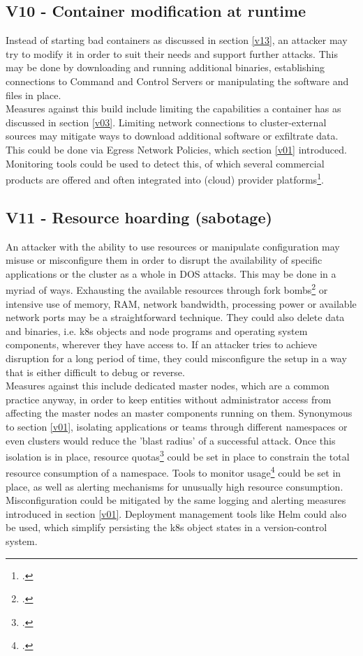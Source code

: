 \subsection{V10 - Container modification at runtime} \label{v10}
Instead of starting bad containers as discussed in section \ref{v13}, an attacker may try to modify it in order to suit their needs and support further attacks.
This may be done by downloading and running additional binaries, establishing connections to Command and Control Servers or manipulating the software and files in place. \\
Measures against this build include limiting the capabilities a container has as discussed in section \ref{v03}. Limiting network connections to cluster-external sources may mitigate ways to download additional software or exfiltrate data. This could be done via Egress Network Policies, which section \ref{v01} introduced.
Monitoring tools could be used to detect this, of which several commercial products are offered and often integrated into (cloud) provider platforms\footcite[][, slide 40 to 41]{runtimeProt}.

\subsection{V11 - Resource hoarding (sabotage)} \label{v11}
An attacker with the ability to use resources or manipulate configuration may misuse or misconfigure them in order to disrupt the availability of specific applications or the cluster as a whole in DOS attacks.
This may be done in a myriad of ways. Exhausting the available resources through fork bombs\footcite[][, chapter 'Fork Bombs and Resource-Based Attacks']{k8sBook} or intensive use of memory, RAM, network bandwidth, processing power or available network ports may be a straightforward technique. They could also delete data and binaries, i.e. \gls{k8s} objects and node programs and operating system components, wherever they have access to.
If an attacker tries to achieve disruption for a long period of time, they could misconfigure the setup in a way that is either difficult to debug or reverse. \\
Measures against this include dedicated master nodes, which are a common practice anyway, in order to keep entities without administrator access from affecting the master nodes an master components running on them. Synonymous to section \ref{v01}, isolating applications or teams through different namespaces or even clusters would reduce the 'blast radius' of a successful attack. Once this isolation is in place, resource quotas\footcite[][, section 'Viewing and Setting Quotas']{resourceQuota} could be set in place to constrain the total resource consumption of a namespace. Tools to monitor usage\footcite[][, first paragraph]{k8sResourceMonitoring} could be set in place, as well as alerting mechanisms for unusually high resource consumption. Misconfiguration could be mitigated by the same logging and alerting measures introduced in section \ref{v01}. Deployment management tools like Helm could also be used, which simplify persisting the \gls{k8s} object states in a version-control system.

